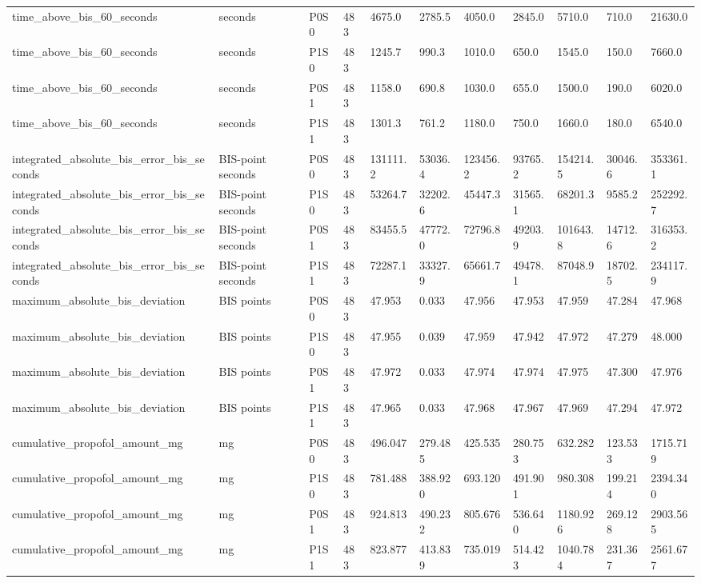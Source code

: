 \begin{tabular}{lllllllllll}
time\_above\_bis\_60\_seconds & seconds & P0S0 & 483 & 4675.0 & 2785.5 & 4050.0 & 2845.0 & 5710.0 & 710.0 & 21630.0 \\
time\_above\_bis\_60\_seconds & seconds & P1S0 & 483 & 1245.7 & 990.3 & 1010.0 & 650.0 & 1545.0 & 150.0 & 7660.0 \\
time\_above\_bis\_60\_seconds & seconds & P0S1 & 483 & 1158.0 & 690.8 & 1030.0 & 655.0 & 1500.0 & 190.0 & 6020.0 \\
time\_above\_bis\_60\_seconds & seconds & P1S1 & 483 & 1301.3 & 761.2 & 1180.0 & 750.0 & 1660.0 & 180.0 & 6540.0 \\
integrated\_absolute\_bis\_error\_bis\_seconds & BIS-point seconds & P0S0 & 483 & 131111.2 & 53036.4 & 123456.2 & 93765.2 & 154214.5 & 30046.6 & 353361.1 \\
integrated\_absolute\_bis\_error\_bis\_seconds & BIS-point seconds & P1S0 & 483 & 53264.7 & 32202.6 & 45447.3 & 31565.1 & 68201.3 & 9585.2 & 252292.7 \\
integrated\_absolute\_bis\_error\_bis\_seconds & BIS-point seconds & P0S1 & 483 & 83455.5 & 47772.0 & 72796.8 & 49203.9 & 101643.8 & 14712.6 & 316353.2 \\
integrated\_absolute\_bis\_error\_bis\_seconds & BIS-point seconds & P1S1 & 483 & 72287.1 & 33327.9 & 65661.7 & 49478.1 & 87048.9 & 18702.5 & 234117.9 \\
maximum\_absolute\_bis\_deviation & BIS points & P0S0 & 483 & 47.953 & 0.033 & 47.956 & 47.953 & 47.959 & 47.284 & 47.968 \\
maximum\_absolute\_bis\_deviation & BIS points & P1S0 & 483 & 47.955 & 0.039 & 47.959 & 47.942 & 47.972 & 47.279 & 48.000 \\
maximum\_absolute\_bis\_deviation & BIS points & P0S1 & 483 & 47.972 & 0.033 & 47.974 & 47.974 & 47.975 & 47.300 & 47.976 \\
maximum\_absolute\_bis\_deviation & BIS points & P1S1 & 483 & 47.965 & 0.033 & 47.968 & 47.967 & 47.969 & 47.294 & 47.972 \\
cumulative\_propofol\_amount\_mg & mg & P0S0 & 483 & 496.047 & 279.485 & 425.535 & 280.753 & 632.282 & 123.533 & 1715.719 \\
cumulative\_propofol\_amount\_mg & mg & P1S0 & 483 & 781.488 & 388.920 & 693.120 & 491.901 & 980.308 & 199.214 & 2394.340 \\
cumulative\_propofol\_amount\_mg & mg & P0S1 & 483 & 924.813 & 490.232 & 805.676 & 536.640 & 1180.926 & 269.128 & 2903.565 \\
cumulative\_propofol\_amount\_mg & mg & P1S1 & 483 & 823.877 & 413.839 & 735.019 & 514.423 & 1040.784 & 231.367 & 2561.677 \\

\end{tabular}
